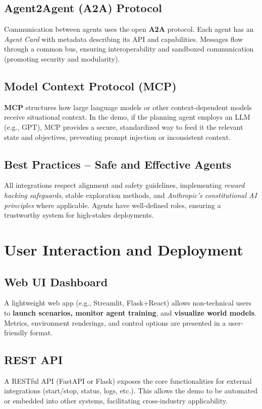 \documentclass{article}
\begin{document}
\subsection{Agent2Agent (A2A) Protocol}
Communication between agents uses the open \textbf{A2A} protocol. Each agent has an \emph{Agent Card} with metadata describing its API and capabilities. Messages flow through a common bus, ensuring interoperability and sandboxed communication (promoting security and modularity).

\subsection{Model Context Protocol (MCP)}
\textbf{MCP} structures how large language models or other context-dependent models receive situational context. In the demo, if the planning agent employs an LLM (e.g., GPT), MCP provides a secure, standardized way to feed it the relevant state and objectives, preventing prompt injection or inconsistent context.

\subsection{Best Practices -- Safe and Effective Agents}
All integrations respect alignment and safety guidelines, implementing \emph{reward hacking safeguards}, stable exploration methods, and \emph{Anthropic’s constitutional AI principles} where applicable. Agents have well-defined roles, ensuring a trustworthy system for high-stakes deployments.

\section{User Interaction and Deployment}

\subsection{Web UI Dashboard}
A lightweight web app (e.g., Streamlit, Flask+React) allows non-technical users to \textbf{launch scenarios, monitor agent training}, and \textbf{visualize world models}. Metrics, environment renderings, and control options are presented in a user-friendly format.

\subsection{REST API}
A RESTful API (FastAPI or Flask) exposes the core functionalities for external integrations (start/stop, status, logs, etc.). This allows the demo to be automated or embedded into other systems, facilitating cross-industry applicability.
\end{document}
